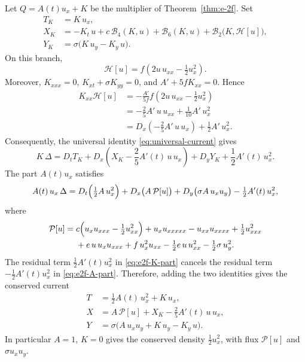 \documentclass[11pt]{article}
\numberwithin{equation}{section}
\theoremstyle{definition}
\theoremstyle{remark}
\begin{document}
Let $Q = A(t)u_x + K$ be the multiplier of
Theorem~\ref{thm:e-2f}. Set
\begin{equation*}
\begin{aligned}
T_K &= K\,u_x,
\\
X_K &=
-K_t\,u
+c\,\mathcal{B}_4(K,u)
+\mathcal{B}_6(K,u)
+\mathcal{B}_2\bigl(K,\mathcal{H}[u]\bigr),
\\
Y_K &= \sigma\bigl(K\,u_y-K_y\,u\bigr).
\end{aligned}
\end{equation*}
On this branch,
\begin{equation*}
\mathcal{H}[u]
=
f\left(2u\,u_{xx}-\tfrac12u_x^2\right).
\end{equation*}
Moreover, $K_{xxx}=0$, $K_{xt}+\sigma K_{yy}=0$, and
$A'+5fK_{xx}=0$. Hence
\begin{align*}
K_{xx}\mathcal{H}[u]
&=
-\frac{A'}{5f}
f\left(2u\,u_{xx}-\tfrac12u_x^2\right)
\\
&=
-\frac25A'\,u\,u_{xx}
+\frac1{10}A'\,u_x^2
\\
&=
D_x\left(-\frac25A'\,u\,u_x\right)
+\frac12A'\,u_x^2.
\end{align*}
Consequently, the universal identity
\eqref{eq:universal-current} gives
\begin{equation}
K\,\Delta
=
D_tT_K
+
D_x\left(
X_K-\frac25A'(t)\,u\,u_x
\right)
+
D_yY_K
+
\frac12A'(t)\,u_x^2.
\label{eq:e2f-K-part}
\end{equation} The part
$A(t)u_x$ satisfies
\begin{equation}
A(t)\,u_x\,\Delta
=
D_t\Bigl(\tfrac12A\,u_x^2\Bigr)
+
D_x\bigl(A\,\mathcal{P}[u]\bigr)
+
D_y\bigl(\sigma A\,u_xu_y\bigr)
-
\tfrac12A'(t)\,u_x^2,
\label{eq:e2f-A-part}
\end{equation}
where
\begin{equation}
\begin{aligned}
\mathcal{P}[u]
= {}& c\Bigl(u_x u_{xxx} - \tfrac12 u_{xx}^2\Bigr)
+ u_x u_{xxxxx} - u_{xx}u_{xxxx} + \tfrac12 u_{xxx}^2
\\
&+ e\,u\,u_x u_{xxx} + f\,u_x^2 u_{xx}
- \tfrac12 e\,u\,u_{xx}^2
- \tfrac12 \sigma\,u_y^2 .
\end{aligned}
\label{eq:P-def}
\end{equation}
The residual term
$\tfrac12A'(t)u_x^2$ in \eqref{eq:e2f-K-part}
cancels the residual term
$-\tfrac12A'(t)u_x^2$ in \eqref{eq:e2f-A-part}.
Therefore, adding the two identities gives the conserved current
\begin{equation}
\begin{aligned}
T
&=
\tfrac12A(t)\,u_x^2+K\,u_x,
\\
X
&=
A\,\mathcal{P}[u]
+X_K
-\frac25A'(t)\,u\,u_x,
\\
Y
&=
\sigma\bigl(
A\,u_xu_y
+K\,u_y
-K_y\,u
\bigr).
\end{aligned}
\label{eq:e2f-current}
\end{equation}
In particular $A=1$, $K=0$ gives the conserved density
$\tfrac12 u_x^2$, with flux $\mathcal{P}[u]$ and
$\sigma u_x u_y$.
\end{document}
